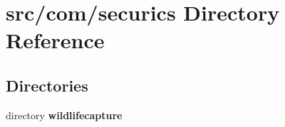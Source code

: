 \section{src/com/securics Directory Reference}
\label{dir_09b6bfa87351d8e6ec1ada81677cd2dc}
\subsection*{Directories}
\begin{DoxyCompactItemize}
\item 
directory {\bf wildlifecapture}
\end{DoxyCompactItemize}
